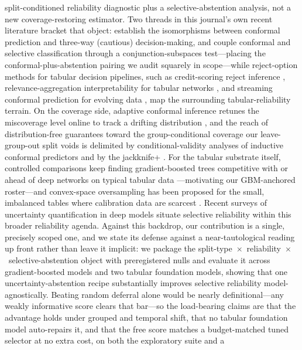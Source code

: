 \documentclass[11pt]{article}
\begin{document}
split-conditioned reliability diagnostic plus a selective-abstention analysis, not a new
coverage-restoring estimator. Two threads in this journal's own recent literature bracket that object:
\citet{campagner2021threeway} establish the isomorphisms between conformal prediction and three-way
(cautious) decision-making, and \citet{he2025conjunction} couple conformal and selective classification
through a conjunction-subspaces test---placing the conformal-plus-abstention pairing we audit squarely
in scope---while reject-option methods for tabular decision pipelines, such as credit-scoring reject
inference \citep{shen2022reject}, relevance-aggregation interpretability for tabular networks
\citep{grisci2021relevance}, and streaming conformal prediction for evolving data
\citep{tanha2022cpssds}, map the surrounding tabular-reliability terrain. On the coverage side, adaptive
conformal inference retunes the miscoverage level online to track a drifting distribution
\citep{gibbs2021adaptive}, and the reach of distribution-free guarantees toward the group-conditional
coverage our leave-group-out split voids is delimited by conditional-validity analyses of inductive
conformal predictors \citep{vovk2013conditional} and by the jackknife+ \citep{barber2021jackknife}.
For the tabular substrate itself, controlled comparisons keep finding gradient-boosted trees
competitive with or ahead of deep networks on typical tabular data
\citep{grinsztajn2022trees,gorishniy2021revisiting}---motivating our GBM-anchored roster---and
convex-space oversampling has been proposed for the small, imbalanced tables where calibration data are
scarcest \citep{schultz2024convgen}. Recent surveys of uncertainty quantification in deep models
\citep{abdar2021review,gawlikowski2023survey} situate selective reliability within this broader
reliability agenda. Against this
backdrop, our contribution is a single, precisely scoped one, and we state its defense against a
near-tautological reading up front rather than leave it implicit: we package the
split-type~$\times$~reliability~$\times$~selective-abstention object with preregistered nulls and evaluate it
across gradient-boosted models and two tabular foundation models, showing that one uncertainty-abstention
recipe substantially improves selective reliability model-agnostically. Beating random deferral alone would be
nearly definitional---any weakly informative score clears that bar---so the load-bearing claims are that the
advantage holds under grouped and temporal shift, that no tabular foundation model auto-repairs it, and that
the free score matches a budget-matched tuned selector at no extra cost, on both the exploratory suite and a
\end{document}
